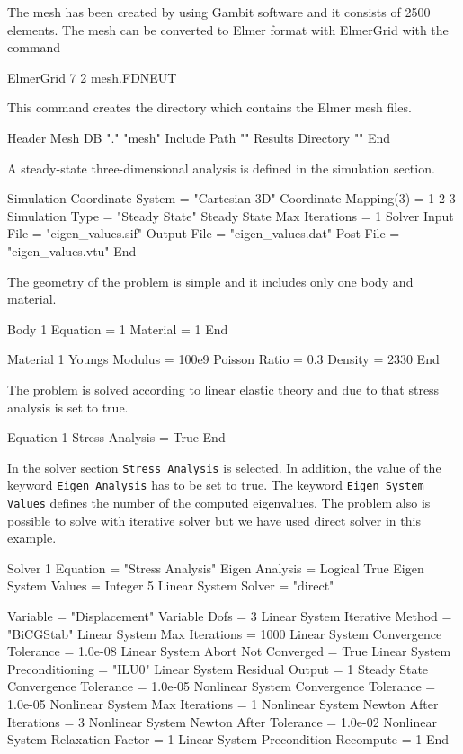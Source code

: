 The mesh has been created by using Gambit software and it consists of 2500 elements. The mesh can be converted to Elmer format with ElmerGrid with the command

\ttbegin
ElmerGrid 7 2 mesh.FDNEUT
\ttend

\begin{flushleft}
This command creates the directory which contains the Elmer mesh files.


\ttbegin
Header
  Mesh DB "." "mesh"
  Include Path ""
  Results Directory ""
End
\ttend

A steady-state three-dimensional analysis is defined in the simulation section.

\ttbegin
Simulation
  Coordinate System = "Cartesian 3D"
  Coordinate Mapping(3) = 1 2 3
  Simulation Type = "Steady State"
  Steady State Max Iterations = 1
  Solver Input File = "eigen_values.sif"
  Output File = "eigen_values.dat"
  Post File = "eigen_values.vtu"
End
\ttend 

The geometry of the problem is simple and it includes only one body and material. 

\ttbegin
Body 1
  Equation = 1
  Material = 1
End

Material 1
  Youngs Modulus = 100e9
  Poisson Ratio = 0.3
  Density = 2330
End
\ttend

The problem is solved according to linear elastic theory and due to that stress analysis is set to true.

\ttbegin
Equation 1
  Stress Analysis = True
End
\ttend

In the solver section {\tt Stress Analysis} is selected. In addition, the value of the keyword 
{\tt Eigen Analysis} has to be set to true. The keyword {\tt Eigen System Values} defines the number of the computed eigenvalues. The problem also is possible to solve with iterative solver but we have used direct solver in this example.

\ttbegin
Solver 1
  Equation = "Stress Analysis"
  Eigen Analysis = Logical True
  Eigen System Values = Integer 5
  Linear System Solver = "direct"

  Variable = "Displacement"
  Variable Dofs = 3
  Linear System Iterative Method = "BiCGStab"
  Linear System Max Iterations = 1000
  Linear System Convergence Tolerance = 1.0e-08
  Linear System Abort Not Converged = True
  Linear System Preconditioning = "ILU0"
  Linear System Residual Output = 1
  Steady State Convergence Tolerance = 1.0e-05
  Nonlinear System Convergence Tolerance = 1.0e-05
  Nonlinear System Max Iterations = 1
  Nonlinear System Newton After Iterations = 3
  Nonlinear System Newton After Tolerance = 1.0e-02
  Nonlinear System Relaxation Factor = 1
  Linear System Precondition Recompute = 1
End
\ttend


\end{flushleft}
